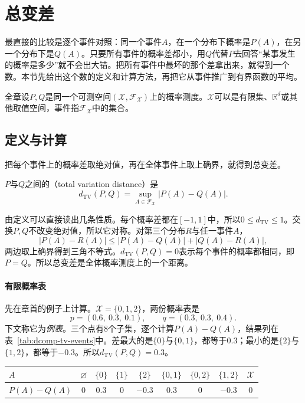 \section{总变差}
\label{sec:dcomp-tv}

最直接的比较是逐个事件对照：同一个事件$A$，在一个分布下概率是$P(A)$，在另一个分布下是$Q(A)$。只要所有事件的概率差都小，用$Q$代替$P$去回答“某事发生的概率是多少”就不会出大错。把所有事件中最坏的那个差拿出来，就得到一个数。本节先给出这个数的定义和计算方法，再把它从事件推广到有界函数的平均。

全章设$P,Q$是同一个可测空间$(\mathcal{X},\mathcal{F}_{\mathcal{X}})$上的概率测度。$\mathcal{X}$可以是有限集、$\mathbb{R}^{d}$或其他取值空间，事件指$\mathcal{F}_{\mathcal{X}}$中的集合。

\subsection{定义与计算}
\label{sec:dcomp-tv-definition}

把每个事件上的概率差取绝对值，再在全体事件上取上确界，就得到总变差。

\begin{definition}[总变差]
\label{def:dcomp-tv}
$P$与$Q$之间的（total variation distance）是
\begin{equation}
 d_{\mathrm{TV}}(P,Q)=\sup_{A\in\mathcal{F}_{\mathcal{X}}}\bigl\lvert P(A)-Q(A)\bigr\rvert .
 \label{eq:dcomp-tv-def}
\end{equation}
\end{definition}

由定义可以直接读出几条性质。每个概率差都在$[-1,1]$中，所以$0\leq d_{\mathrm{TV}}\leq1$。交换$P,Q$不改变绝对值，所以它对称。对第三个分布$R$与任一事件$A$，
\[
 \lvert P(A)-R(A)\rvert\leq\lvert P(A)-Q(A)\rvert+\lvert Q(A)-R(A)\rvert ,
\]
两边取上确界得到三角不等式。$d_{\mathrm{TV}}(P,Q)=0$表示每个事件的概率都相同，即$P=Q$。所以总变差是全体概率测度上的一个距离。

\paragraph{有限概率表}
先在章首的例子上计算。$\mathcal{X}=\{0,1,2\}$，两份概率表是
\[
 p=(0.6,\ 0.3,\ 0.1),\qquad q=(0.3,\ 0.3,\ 0.4) .
\]
下文称它为\emph{例表}。三个点有$8$个子集，逐个计算$P(A)-Q(A)$，结果列在表~\ref{tab:dcomp-tv-events}中。差最大的是$\{0\}$与$\{0,1\}$，都等于$0.3$；最小的是$\{2\}$与$\{1,2\}$，都等于$-0.3$。所以$d_{\mathrm{TV}}(P,Q)=0.3$。

\begin{BookInlineTable}
 \centering
 \caption{例表中每个事件的概率差。}
 \label{tab:dcomp-tv-events}
 \begin{tabular}{lcccccccc}
  \toprule
  $A$ & $\varnothing$ & $\{0\}$ & $\{1\}$ & $\{2\}$ & $\{0,1\}$ & $\{0,2\}$ & $\{1,2\}$ & $\mathcal{X}$\\
  \midrule
  $P(A)-Q(A)$ & $0$ & $0.3$ & $0$ & $-0.3$ & $0.3$ & $0$ & $-0.3$ & $0$\\
  \bottomrule
 \end{tabular}
\end{BookInlineTable}

